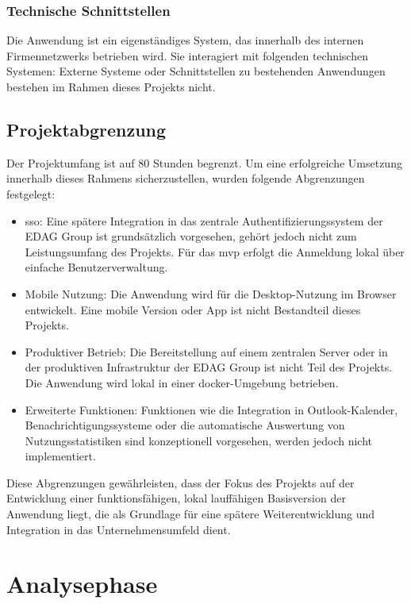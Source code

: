 \documentclass[11pt,a4paper]{report}
\begin{document}
\subsection{Technische Schnittstellen}

Die Anwendung ist ein eigenständiges System, das innerhalb des internen Firmennetzwerks betrieben wird.
Sie interagiert mit folgenden technischen Systemen:
Externe Systeme oder Schnittstellen zu bestehenden Anwendungen bestehen im Rahmen dieses Projekts nicht.

\section{Projektabgrenzung}

Der Projektumfang ist auf 80 Stunden begrenzt. Um eine erfolgreiche Umsetzung innerhalb dieses Rahmens sicherzustellen, wurden folgende Abgrenzungen festgelegt:

\begin{itemize}
  \item  \gls{sso}: Eine spätere Integration in das zentrale Authentifizierungssystem der EDAG Group ist grundsätzlich vorgesehen, gehört jedoch nicht zum Leistungsumfang des Projekts. Für das \gls{mvp} erfolgt die Anmeldung lokal über einfache Benutzerverwaltung.

  \item  Mobile Nutzung: Die Anwendung wird für die Desktop-Nutzung im Browser entwickelt. Eine mobile Version oder App ist nicht Bestandteil dieses Projekts.

  \item  Produktiver Betrieb: Die Bereitstellung auf einem zentralen Server oder in der produktiven Infrastruktur der EDAG Group ist nicht Teil des Projekts. Die Anwendung wird lokal in einer \gls{docker}-Umgebung betrieben.

  \item  Erweiterte Funktionen: Funktionen wie die Integration in Outlook-Kalender, Benachrichtigungssysteme oder die automatische Auswertung von Nutzungsstatistiken sind konzeptionell vorgesehen, werden jedoch nicht implementiert.
\end{itemize}

Diese Abgrenzungen gewährleisten, dass der Fokus des Projekts auf der Entwicklung einer funktionsfähigen, lokal lauffähigen Basisversion der Anwendung liegt, die als Grundlage für eine spätere Weiterentwicklung und Integration in das Unternehmensumfeld dient.

\chapter{Analysephase}  
\end{document}

